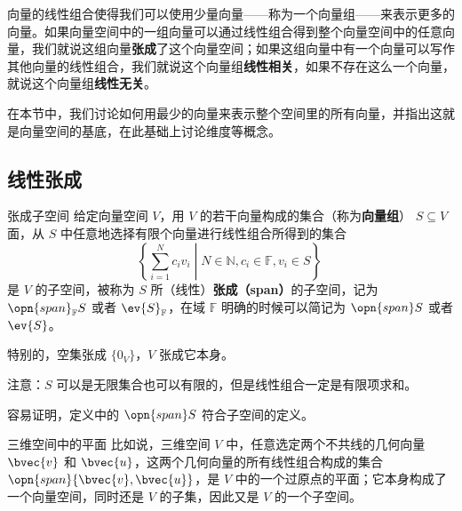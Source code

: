 
\begin{issues}
\issueTODO
\end{issues}


向量的线性组合使得我们可以使用少量向量——称为一个向量组——来表示更多的向量。如果向量空间中的一组向量可以通过线性组合得到整个向量空间中的任意向量，我们就说这组向量\textbf{张成}了这个向量空间；如果这组向量中有一个向量可以写作其他向量的线性组合，我们就说这个向量组\textbf{线性相关}，如果不存在这么一个向量，就说这个向量组\textbf{线性无关}。

在本节中，我们讨论如何用最少的向量来表示整个空间里的所有向量，并指出这就是向量空间的基底，在此基础上讨论维度等概念。

\subsection{线性张成}

\begin{definition}{张成子空间}\label{def_VecSpn_1}
给定向量空间 $V$，用 $V$ 的若干向量构成的集合（称为\textbf{向量组}） $S \subseteq V$面，从 $S$ 中任意地选择有限个向量进行线性组合所得到的集合 
\begin{equation}
\left\{\sum_{i = 1}^N c_iv_i \middle| N \in\mathbb{N}, c_i\in\mathbb{F}, v_i \in S\right\}~
\end{equation}
是 $V$ 的子空间，被称为 $S$ 所（线性）\textbf{张成（span）}的子空间，记为 $\opn{span}_\mathbb{F} S$ 或者 $\ev{S}_\mathbb{F}$，在域 $\mathbb{F}$ 明确的时候可以简记为 $\opn{span} S$ 或者 $\ev{S}$。

特别的，空集张成 $\{0_V\}$，$V$ 张成它本身。
\end{definition}

注意：$S$ 可以是无限集合也可以有限的，但是线性组合一定是有限项求和。

容易证明，定义中的 $\opn{span} S$ 符合子空间的定义。
\begin{example}{三维空间中的平面}
比如说，三维空间 $V$ 中，任意选定两个不共线的几何向量 $\bvec{v}$ 和 $\bvec{u}$，这两个几何向量的所有线性组合构成的集合 $\opn{span}\{\bvec{v}, \bvec{u}\}$，是 $V$ 中的一个过原点的平面；它本身构成了一个向量空间，同时还是 $V$ 的子集，因此又是 $V$ 的一个子空间。
\end{example}


